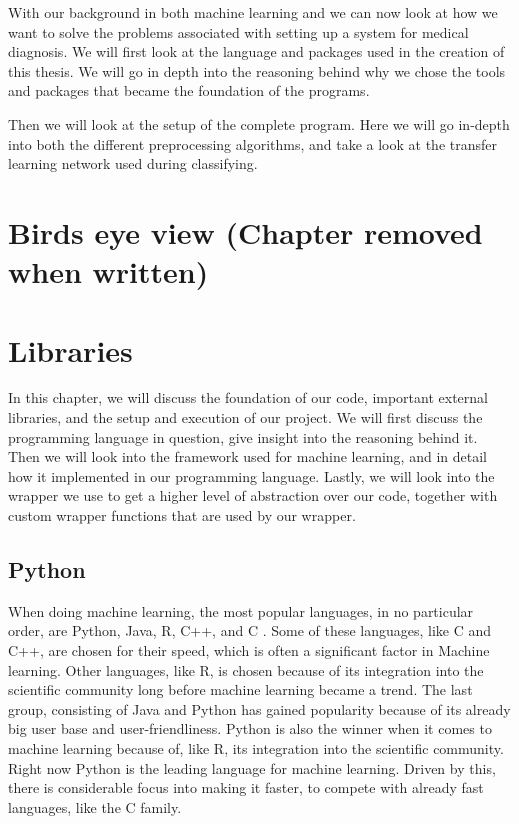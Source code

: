 With our background in both machine learning and  we can now look at how we want to solve the problems associated with setting up a system for medical diagnosis.  
We will first look at the language and packages used in the creation of this thesis. We will go in depth into the reasoning behind why we chose the tools and packages that became the foundation of the programs. 

Then we will look at the setup of the complete program. Here we will go in-depth into both the different preprocessing algorithms, and take a look at the transfer learning network used during classifying.
\section{Birds eye view (Chapter removed when written)}

\section{Libraries} 
In this chapter, we will discuss the foundation of our code, important external libraries, and the setup and execution of our project.  
We will first discuss the programming language in question, give insight into the reasoning behind it. Then we will look into the framework used for machine learning, and in detail how it implemented in our programming language. Lastly, we will look into the wrapper we use to get a higher level of abstraction over our code, together with custom wrapper functions that are used by our wrapper. 

\subsection{Python}
When doing machine learning, the most popular languages, in no particular order, are Python, Java, R, C++, and C . Some of these languages, like C and C++, are chosen for their speed, which is often a significant factor in Machine learning. Other languages, like R, is chosen because of its integration into the scientific community long before machine learning became a trend. The last group, consisting of Java and Python has gained popularity because of its already big user base and user-friendliness. Python is also the winner when it comes to machine learning because of, like R, its integration into the scientific community. 
Right now Python is the leading language for machine learning. Driven by this, there is considerable focus into making it faster, to compete with already fast languages, like the C family. 

